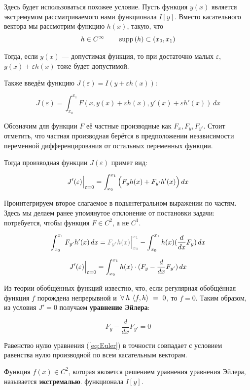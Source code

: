 \documentclass[12pt]{article}
\begin{document}
			Здесь будет использоваться похожее условие. Пусть функция $y(x)$ является экстремумом 
			рассматриваемого нами функционала $I[y]$. Вместо касательного вектора мы рассмотрим
			функцию $h(x)$, такую, что
			$$h \in C^{\infty} \qquad \,\text{supp}\,(h) \subset (x_0, x_1)$$
	
			Тогда, если $y(x)$ --- допустимая функция, то при достаточно малых $\varepsilon$,
			$y(x) + \varepsilon h(x)$ тоже будет допустимой.
			
			Также введём функцию $J(\varepsilon) = I(y + \varepsilon h(x))$:

			$$J(\varepsilon) = \int_{x_0}^{x_1} F(x, y(x) + \varepsilon h(x), y'(x) + \varepsilon h'(x))\,dx$$

			Обозначим для функции $F$ её частные производные как $F_x, F_y, F_{y'}$. Стоит отметить, что
			частная производная берётся в предположении независимости переменной дифференцирования от
			остальных переменных функции.

			Тогда производная функции $J(\varepsilon)$ примет вид:
	
			$$J'(\varepsilon)\Big|_{\varepsilon = 0}^{} = \int_{x_0}^{x_1} \Big( F_{y}h(x) + F_{y'}h'(x) \Big)\,dx$$
	
			Проинтегрируем второе слагаемое в подынтегральном выражении по частям. Здесь мы делаем ранее
			упомянутое отклонение от постановки задачи: потребуется, чтобы функция $F \in C^2$, а не $C^1$.

			$$\int_{x_0}^{x_1} F_{y'}h'(x) \,dx = \off{F_{y'}h(x) \lims{x_0}{x_1}} - \int_{x_0}^{x_1} h(x)(\frac{d}{dx} F_y)\,dx$$

			$$J'(\varepsilon)\Big|_{\varepsilon = 0}^{} = \int_{x_0}^{x_1}h(x)\cdot(F_y - \frac{d}{dx}F_{y'}) \,dx$$


			Из теории обобщённых функций известно, что, если регулярная обобщённая функция $f$ порождена
			непрерывной и $\forall h\:\scal{f}{h}~=~0$, то $f = 0$. Таким образом, из условия $J' = 0$
			получаем \textbf{уравнение Эйлера}:

			\begin{equation} \label{eq:Euler}
				F_y - \frac{d}{dx}F_{y'} = 0 
			\end{equation}
	
			Равенство нулю уравнения (\ref{eq:Euler}) в точности совпадает с условием равенства нулю
			производной по всем касательным векторам.
	
			\begin{defi}
				Функция $f(x) \in C^2$, которая является решением уравнения уравнения Эйлера, называется
				\textbf{экстремалью}.
				функционала $I[y]$.
			\end{defi}
			
\end{document}
